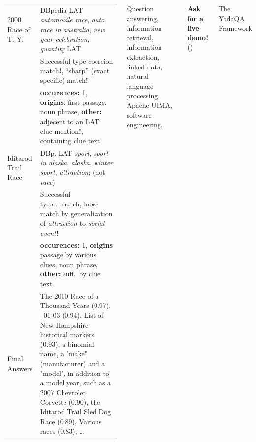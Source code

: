 \documentclass[xcolor=table]{beamer}
\begin{document}
\begin{frame}[fragile]{}
\begin{columns}[t]
\begin{columns}[t]
\begin{tabular}{|p{3.6cm}p{13cm}|}
\hspace{0pt}\alert{2000 Race of T. Y.} %
	& DBpedia LAT \textit{automobile race}, \textit{auto race in australia}, \textit{new year celebration}, \textit{quantity} LAT \\
	& Successful type coercion match\textbf{!}, ``sharp'' (exact specific) match\textbf{!} \\
	& \textbf{occurences:} 1, \textbf{origins:}  first passage, noun phrase, \textbf{other:} adjecent to an LAT clue mention\textbf{!}, containing clue text \\
\hspace{0pt}\alert{Iditarod Trail Race} %
	& DBp. LAT \textit{sport}, \textit{sport in alaska}, \textit{alaska}, \textit{winter sport}, \textit{attraction}; (not \textit{race}) \\
	& Successful tycor.\ match, loose match by generalization of \textit{attraction} to \textit{social event}\textbf{!} \\
	& \textbf{occurences:} 1, \textbf{origins}   passage by various clues, noun phrase,
	\textbf{other:} suff.\ by clue text \\ \hline

Final Answers & The 2000 Race of a Thousand Years (0.97), --01-03 (0.94), List of New Hampshire historical markers (0.93), a binomial name, a "make" (manufacturer) and a "model", in addition to a model year, such as a 2007 Chevrolet Corvette (0.90), \alert{the Iditarod Trail Sled Dog Race} (0.89), Various races (0.83), \dots \\ \hline
\end{tabular}
\end{columns}


    {
	Question answering, information retrieval, information extraction,
	linked data, natural language processing, Apache UIMA,
	software engineering.}
    \vspace{3ex}

    {%
	    \centering
	    \large {\bfseries
	    \alert{Ask for a live demo!}
	    } ()
	    \par
    }

    \vspace{3ex}

    \begin{block}{The YodaQA Framework}
      \begin{multicols}{2}
	\setlength{\parskip}{1ex}
	\vspace{-1ex}


\end{multicols}
\end{block}
\end{columns}
\end{frame}
\end{document}

